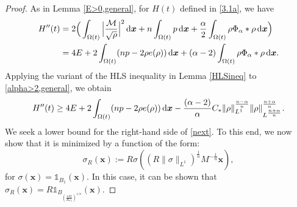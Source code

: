 \documentclass[reqno,11pt]{amsart}
\numberwithin{equation}{section}
\theoremstyle{definition}
\def\dd{{\, \rm d}}
\begin{document}
\begin{proof}
As in Lemma \ref{E>0,general}, for $H(t)$ defined in \eqref{3.1a}, we have
\begin{align}\label{alpha>2,general}
 \begin{split}
 H''(t) & =2\Big(\int_{\Omega(t)}\Big| \frac{\mathcal{M}}{\sqrt{\rho}} \Big |^2\dd \boldsymbol{x}+n\int_{\Omega(t)}p\dd \boldsymbol{x} + \frac{\alpha}{2} \int_{\Omega(t)}\rho \Phi_\alpha\ast\rho\dd \boldsymbol{x}\Big) \\
 & = 4 E + 2\int_{\Omega(t)}(np - 2 \rho e(\rho))\dd \boldsymbol{x} + (\alpha - 2)\int_{\Omega(t)}\rho \Phi_\alpha\ast\rho\dd \boldsymbol{x}. \\
  \end{split}
    \end{align}
Applying the variant of the HLS inequality in Lemma \ref{HLSineq} to \eqref{alpha>2,general}, we obtain
 \begin{equation}\label{next}
  H''(t) \geq 4 E + 2\int_{\Omega(t)}(np - 2 \rho e(\rho))\dd \boldsymbol{x} - \frac{(\alpha - 2)}{\alpha} C_* \| \rho \|_{L^1}^\frac{n-\alpha}{n} \| \rho \|_{L^\frac{n+\alpha}{n}}^\frac{n+\alpha}{n}.
        \end{equation}
We seek a lower bound for the right-hand side of \eqref{next}. 
To this end, we now show that it is minimized by a function of the form: 
\begin{equation}\label{scale}
    \sigma_R(\boldsymbol{x}) := R \sigma ((R \|\sigma\|_{L^1})^\frac{1}{n} M^{-\frac{1}{n}} \boldsymbol{x} ),
\end{equation}
for $\sigma(\boldsymbol{x}) = \mathds{1}_{B_1}(\boldsymbol{x})$. In this case, it can be shown that $\sigma_{R}(\boldsymbol{x}) = R\mathds{1}_{B_{(\frac{nM}{R \omega_n})^{1/n}}}(\boldsymbol{x})$.


\end{proof}
\end{document}
